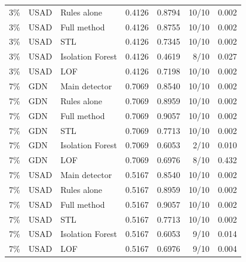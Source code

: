 \documentclass[11pt,a4paper]{article}
\begin{document}
\begin{longtable}{@{}l l l r r r r@{}}
3\% & USAD & Rules alone & 0.4126 & 0.8794 & 10/10 & 0.002 \\
3\% & USAD & Full method & 0.4126 & 0.8755 & 10/10 & 0.002 \\
3\% & USAD & STL & 0.4126 & 0.7345 & 10/10 & 0.002 \\
3\% & USAD & Isolation Forest & 0.4126 & 0.4619 & 8/10 & 0.027 \\
3\% & USAD & LOF & 0.4126 & 0.7198 & 10/10 & 0.002 \\
\midrule
7\% & GDN & Main detector & 0.7069 & 0.8540 & 10/10 & 0.002 \\
7\% & GDN & Rules alone & 0.7069 & 0.8959 & 10/10 & 0.002 \\
7\% & GDN & Full method & 0.7069 & 0.9057 & 10/10 & 0.002 \\
7\% & GDN & STL & 0.7069 & 0.7713 & 10/10 & 0.002 \\
7\% & GDN & Isolation Forest & 0.7069 & 0.6053 & 2/10 & 0.010 \\
7\% & GDN & LOF & 0.7069 & 0.6976 & 8/10 & 0.432 \\
7\% & USAD & Main detector & 0.5167 & 0.8540 & 10/10 & 0.002 \\
7\% & USAD & Rules alone & 0.5167 & 0.8959 & 10/10 & 0.002 \\
7\% & USAD & Full method & 0.5167 & 0.9057 & 10/10 & 0.002 \\
7\% & USAD & STL & 0.5167 & 0.7713 & 10/10 & 0.002 \\
7\% & USAD & Isolation Forest & 0.5167 & 0.6053 & 9/10 & 0.014 \\
7\% & USAD & LOF & 0.5167 & 0.6976 & 9/10 & 0.004 \\
\end{longtable}
\endgroup
\end{document}

